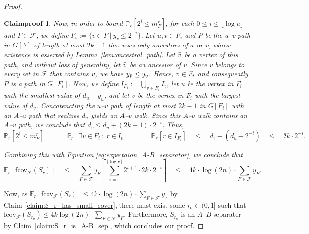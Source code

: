 \documentclass[10pt,a4paper]{amsart}
\newtheorem{claimproof}{Claimproof}
\newcommand{\f}{\mathcal{F}}
\newcommand{\fcov}{\mathrm{fcov}_{\mathcal{F}}}
\begin{document}
\begin{proof}
\begin{claimproof}
        Now, in order to bound $\mathbb{P}_r[2^i \leq m_F^r]$, for each $0 \leq i \leq \lfloor \log n \rfloor$ and $F \in \f$, we define $F_i := \{v\in F\ |\ y_v\leq 2^{-i}\}$. Let $u, v \in F_i$ and $P$ be the $u$--$v$ path in $G[F]$ of length at most $2k-1$ that uses only ancestors of $u$ or $v$, whose existence is asserted by Lemma~\ref{lem:ancestral_path}. Let $\Bar{v}$ be a vertex of this path, and without loss of generality, let $\Bar{v}$ be an ancestor of $v$. Since $v$ belongs to every set in $\f$ that contains $\Bar{v}$, we have $y_{\Bar{v}} \leq y_v$. Hence, $\Bar{v} \in F_i$ and consequently $P$ is a path in $G[F_i]$.
        Now, we define $I_{F_i} := \bigcup_{v \in F_i} I_v$, let $u$ be the vertex in $F_i$ with the smallest value of $d_u - y_u$, and let $v$ be the vertex in $F_i$ with the largest value of $d_v$. Concatenating the $u$--$v$ path of length at most $2k-1$ in $G[F_i]$ with an $A$--$u$ path that realizes $d_u$ yields an $A$--$v$ walk. Since this $A$--$v$ walk contains an $A$--$v$ path, we conclude that $d_v \le d_u + (2k-1) \cdot 2^{-i}$.
        Thus, 
        $$
        \mathbb{P}_r[2^i \leq m_F^r] 
        \quad = \quad \mathbb{P}_r\left[\exists v \in F_i\ :\ r \in I_v \right] 
        \quad = \quad \mathbb{P}_r\left[r \in I_{F_i} \right] 
        \quad \leq \quad d_v - (d_u-2^{-i}) 
        \quad \leq \quad 2k \cdot 2^{-i}.
        $$
        
        Combining this with Equation \ref{eq:expectaion_A-B_separator}, we conclude that 
        $$
        \mathbb{E}_r[\fcov(S_r)] \quad
        \leq \quad \sum_{F \in \f} y_F \left[ \sum_{i = 0}^{\lfloor \log n \rfloor} 2^{i+1} \cdot 2k \cdot 2^{-i} \right] \quad
        \leq \quad 4k \cdot \log(2n) \cdot \sum_{F \in \f} y_F. 
        $$
    \end{claimproof}
    
    Now, as $\mathbb{E}_r[\fcov(S_r)] \leq 4k \cdot \log(2n) \cdot \sum_{F \in \f} y_F$ by Claim~\ref{claim:S_r_has_small_cover}, there must exist some $r_o\in(0,1]$ such that %
    $\fcov(S_{r_o}) \leq 4k \log(2n) \cdot \sum_{F \in \f} y_F$. Furthermore, $S_{r_o}$ is an $A$--$B$ separator by Claim~\ref{claim:S_r_is_A-B_sep}, which concludes our proof.
\end{proof}
\end{document}
